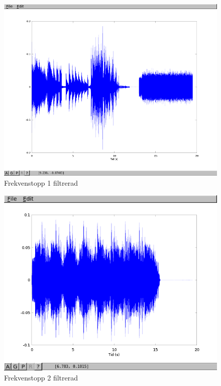 \documentclass[10pt]{article}
\begin{document}
\begin{figure}[htp]
  \begin{center}
  \includegraphics[keepaspectratio=true,width=\linewidth]{topp1_filter.png}  %
  \end{center}
  \caption{Frekvenstopp 1 filtrerad} %
  \label{fig:topp1_filter}
\end{figure}

\begin{figure}[htp]
  \begin{center}
  \includegraphics[keepaspectratio=true,width=\linewidth]{topp2_filter.png}  %
  \end{center}
  \caption{Frekvenstopp 2 filtrerad} %
  \label{fig:topp2_filter}
\end{figure}
\end{document}

